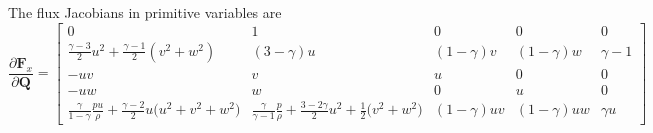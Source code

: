 \documentclass{report}
\begin{document}
The flux Jacobians in primitive variables are
\begin{equation}
	\frac{\partial \mathbf{F}_x}{\partial \mathbf{Q}} = 
	\begin{bmatrix}
		0  & 1 & 0 & 0 & 0   \\ %
		\frac{\gamma-3}{2} u^2 + \frac{\gamma-1}{2} (v^2 + w^2) & 
		(3-\gamma) u & 
		(1-\gamma) v & 
		(1-\gamma) w & 
		\gamma - 1  \\ %
		-uv & 
		v &
		u & 0 & 0  \\ %
		- uw & 
		w & 0 & u & 0  \\ %
		\frac{\gamma}{1-\gamma} \frac{ p u }{\rho} + \frac{\gamma -2}{2} u \big(u^2 + v^2 + w^2 \big) &
		\frac{\gamma}{\gamma-1} \frac{p}{\rho} + \frac{3-2\gamma}{2}u^2 + \frac{1}{2} \big(v^2+w^2) &
		(1-\gamma) uv &
		(1-\gamma) uw &
		\gamma u
	\end{bmatrix}
\end{equation}
\end{document}

